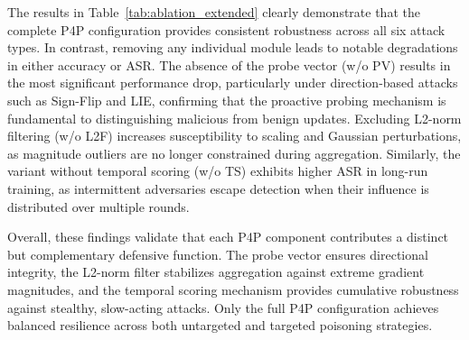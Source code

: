 The results in Table~\ref{tab:ablation_extended} clearly demonstrate that the complete P4P configuration provides consistent robustness across all six attack types. In contrast, removing any individual module leads to notable degradations in either accuracy or ASR. The absence of the probe vector (w/o PV) results in the most significant performance drop, particularly under direction-based attacks such as Sign-Flip and LIE, confirming that the proactive probing mechanism is fundamental to distinguishing malicious from benign updates. Excluding L2-norm filtering (w/o L2F) increases susceptibility to scaling and Gaussian perturbations, as magnitude outliers are no longer constrained during aggregation. Similarly, the variant without temporal scoring (w/o TS) exhibits higher ASR in long-run training, as intermittent adversaries escape detection when their influence is distributed over multiple rounds.

Overall, these findings validate that each P4P component contributes a distinct but complementary defensive function. The probe vector ensures directional integrity, the L2-norm filter stabilizes aggregation against extreme gradient magnitudes, and the temporal scoring mechanism provides cumulative robustness against stealthy, slow-acting attacks. Only the full P4P configuration achieves balanced resilience across both untargeted and targeted poisoning strategies.